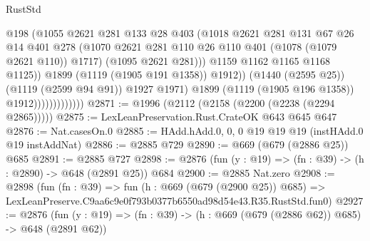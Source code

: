 \begin{lexlean}{RustStd}
\begin{coremodule}
                                        @198
                                        (@1055
                                          @2621
                                          @281
                                          @133
                                          @28
                                          @403
                                          (@1018
                                            @2621
                                            @281
                                            @131
                                            @67
                                            @26
                                            @14
                                            @401
                                            @278
                                            (@1070
                                              @2621
                                              @281
                                              @110
                                              @26
                                              @110
                                              @401
                                              (@1078 (@1079 @2621 @110))
                                              @1717)
                                            (@1095 @2621 @281)))
                                        @1159
                                        @1162
                                        @1165
                                        @1168
                                        @1125))
                                    @1899
                                    (@1119 (@1905 @191 @1358))
                                    @1912))
                                (@1440 (@2595 @25))
                                (@1119 (@2599 @94 @91))
                                @1927
                                @1971)
                              @1899
                              (@1119 (@1905 @196 @1358))
                              @1912)))))))))))))
@2871 := @1996 (@2112 (@2158 (@2200 (@2238 (@2294 @2865)))))
@2875 := LexLeanPreservation.Rust.CrateOK @643 @645 @647
@2876 := Nat.casesOn.{0}
@2885 := HAdd.hAdd.{0, 0, 0} @19 @19 @19 (instHAdd.{0} @19 instAddNat)
@2886 := @2885 @729
@2890 := @669 (@679 (@2886 @25)) @685
@2891 := @2885 @727
@2898 := @2876 (fun (y : @19) => (fn : @39) -> (h : @2890) -> @648 (@2891 @25)) @684
@2900 := @2885 Nat.zero
@2908 := @2898
    (fun (fn : @39) =>
    fun (h : @669 (@679 (@2900 @25)) @685) =>
    LexLeanPreserve.C9aa6c9e0f793b0377b6550ad98d54e43.R35.RustStd.fun0)
@2927 := @2876
    (fun (y : @19) => (fn : @39) -> (h : @669 (@679 (@2886 @62)) @685) -> @648 (@2891 @62))

\end{coremodule}
\end{lexlean}
